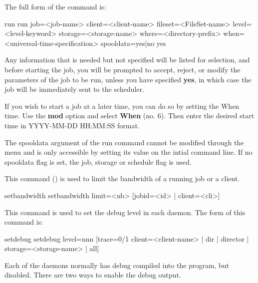 \begin{description}
   The full form of the command is:

\begin{bconsole}{run}
run job=<job-name> client=<client-name>
  fileset=<FileSet-name>  level=<level-keyword>
  storage=<storage-name>  where=<directory-prefix>
  when=<universal-time-specification> spooldata=yes|no yes
\end{bconsole}

   Any information that is needed but not specified will be listed for
   selection, and before starting the job, you will be prompted to accept,
   reject, or modify the parameters of the job to be run, unless you have
   specified {\bf yes}, in which case the job will be immediately sent to
   the scheduler.

   If you wish to start a job at a later time, you can do so by setting  the When
   time. Use the {\bf mod} option and select {\bf When} (no. 6).  Then enter the
   desired start time in YYYY-MM-DD HH:MM:SS format.

   The spooldata argument of the run command cannot be modified through the menu
   and is only accessible by setting its value on the intial command line. If
   no spooldata flag is set, the job, storage or schedule flag is used.

\item[setbandwidth]
  This command () is used to limit the bandwidth of a running job or a client.

\begin{bconsole}{setbandwidth}
setbandwidth limit=<nb> [jobid=<id> | client=<cli>]
\end{bconsole}


\item [setdebug]
    \label{bconsole_setdebug}
   This command is used to set the debug level in each  daemon. The form of this
   command is:

\begin{bconsole}{setdebug}
setdebug level=nnn [trace=0/1 client=<client-name> | dir | director | storage=<storage-name> | all]
\end{bconsole}

   Each of the daemons normally has debug compiled into the program, but
   disabled. There are two ways to enable the debug output.


\end{description}
